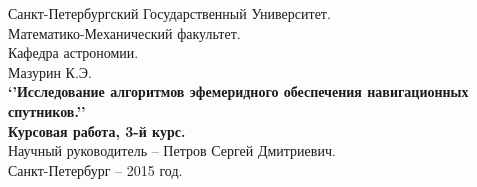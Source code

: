 \documentclass[a4paper,12pt]{report}
\begin{document}
\begin{titlepage}
\begin{center}
\vspace{8cm}
Санкт-Петербургский Государственный Университет. \\ Математико-Механический факультет. \\ Кафедра астрономии. \\
\vspace{2cm}
Мазурин К.Э. \\
\vspace{1cm}
\Large
{\bf ‘’Исследование алгоритмов эфемеридного обеспечения навигационных спутников.’’\\ Курсовая работа, 3-й курс. } \\
\vspace{1cm}
Научный руководитель -- Петров Сергей Дмитриевич.\\
\vspace{13cm}
Санкт-Петербург -- 2015 год.
\end{center}
\end{titlepage}

{\large\tableofcontents}
\newpage

\large
\end{document}
